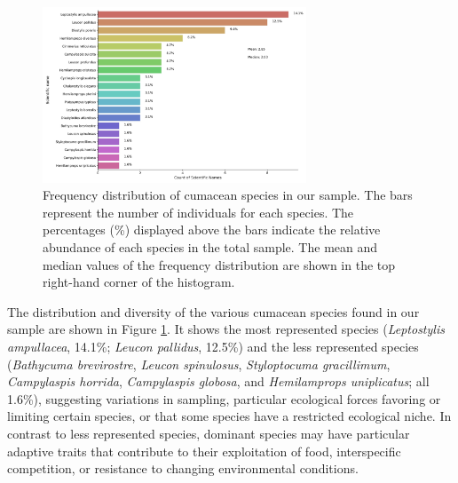\begin{figure}[htbp]
    \centering
    \includegraphics[width=0.7\textwidth]{figure2.jpg}
    \caption{Frequency distribution of cumacean species in our sample. The bars represent the number of individuals for each species. The percentages (\%) displayed above the bars indicate the relative abundance of each species in the total sample. The mean and median values of the frequency distribution are shown in the top right-hand corner of the histogram. \label{fig:fig3}}
\end{figure}

The distribution and diversity of the various cumacean species found in our sample are shown in Figure \ref{fig:fig3}. It shows the most represented species (\emph{Leptostylis ampullacea}, 14.1\%; \emph{Leucon pallidus}, 12.5\%) and the less represented species (\emph{Bathycuma brevirostre}, \emph{Leucon spinulosus}, \emph{Styloptocuma gracillimum}, \emph{Campylaspis horrida}, \emph{Campylaspis globosa}, and \emph{Hemilamprops uniplicatus}; all 1.6\%), suggesting variations in sampling, particular ecological forces favoring or limiting certain species, or that some species have a restricted ecological niche. In contrast to less represented species, dominant species may have particular adaptive traits that contribute to their exploitation of food, interspecific competition, or resistance to changing environmental conditions.

